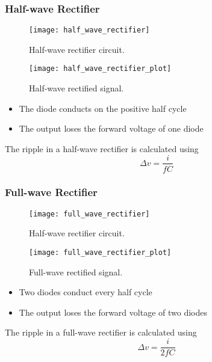\documentclass{article}
\begin{document}
\subsubsection{Half-wave Rectifier}
\begin{figure}[H]
    \centering
    \texttt{[image: half\_wave\_rectifier]}
    \caption{Half-wave rectifier circuit.}
\end{figure}
\begin{figure}[H]
    \centering
    \texttt{[image: half\_wave\_rectifier\_plot]}
    \caption{Half-wave rectified signal.}
\end{figure}
\begin{itemize}
    \item The diode conducts on the positive half cycle
    \item The output loses the forward voltage of one diode
\end{itemize}
The ripple in a half-wave rectifier is calculated using
\begin{equation*}
    \Delta v = \frac{i}{fC}
\end{equation*} 
\subsubsection{Full-wave Rectifier}
\begin{figure}[H]
    \centering
    \texttt{[image: full\_wave\_rectifier]}
    \caption{Half-wave rectifier circuit.}
\end{figure}
\begin{figure}[H]
    \centering
    \texttt{[image: full\_wave\_rectifier\_plot]}
    \caption{Full-wave rectified signal.}
\end{figure}
\begin{itemize}
    \item Two diodes conduct every half cycle
    \item The output loses the forward voltage of two diodes
\end{itemize}
The ripple in a full-wave rectifier is calculated using
\begin{equation*}
    \Delta v = \frac{i}{2fC}
\end{equation*} 
\end{document}
